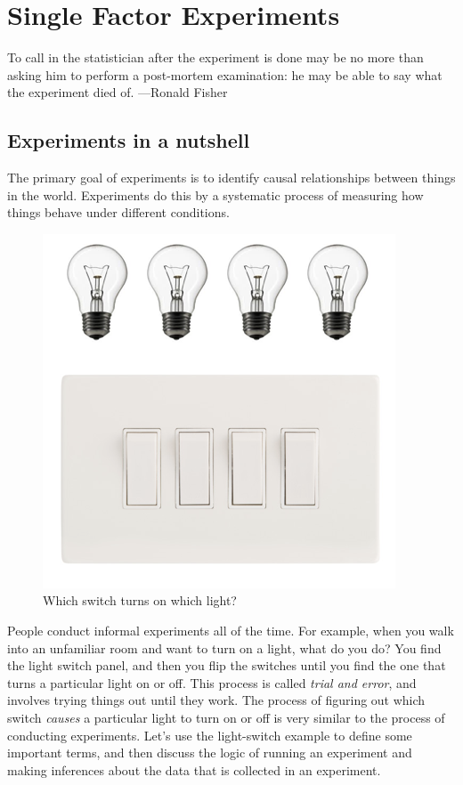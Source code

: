 \chapter{Single Factor Experiments}

To call in the statistician after the experiment is done may be no more than asking him to perform a post-mortem examination: he may be able to say what the experiment died of.
---Ronald Fisher

\section{Experiments in a nutshell}

The primary goal of experiments is to identify causal relationships between things in the world. Experiments do this by a systematic process of measuring how things behave under different conditions.

\begin{figure}[0in]
\includegraphics[width=\linewidth]{figures/lightswitch.png}
\caption{Which switch turns on which light?}
\label{fig:confound}
\end{figure}

People conduct informal experiments all of the time. For example, when you walk into an unfamiliar room and want to turn on a light, what do you do? You find the light switch panel, and then you flip the switches until you find the one that turns a particular light on or off. This process is called \emph{trial and error}, and involves trying things out until they work. The process of  figuring out which switch \emph{causes} a particular light to turn on or off is very similar to the process of conducting experiments. Let's use the light-switch example to define some important terms, and then discuss the logic of running an experiment and making inferences about the data that is collected in an experiment.

